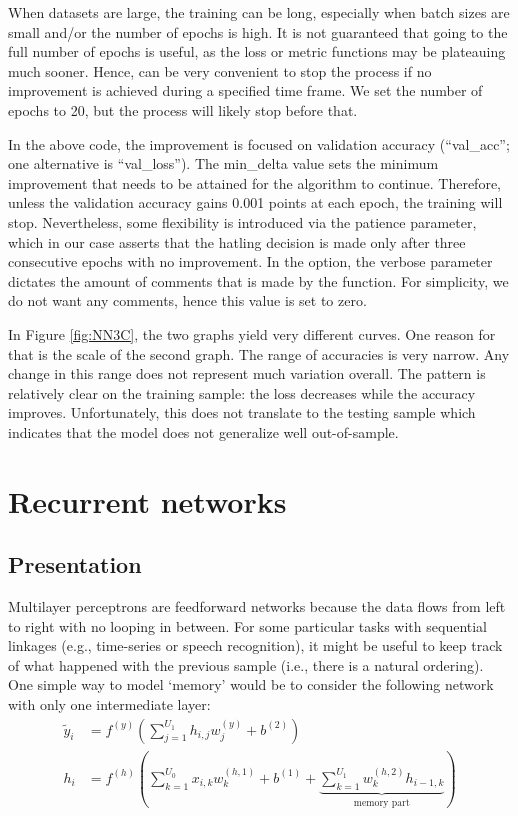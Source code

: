 \documentclass[]{krantz}
\theoremstyle{definition}
\theoremstyle{definition}
\theoremstyle{definition}
\theoremstyle{remark}
\begin{document}
When datasets are large, the training can be long, especially when batch
sizes are small and/or the number of epochs is high. It is not
guaranteed that going to the full number of epochs is useful, as the
loss or metric functions may be plateauing much sooner. Hence, can be
very convenient to stop the process if no improvement is achieved during
a specified time frame. We set the number of epochs to 20, but the
process will likely stop before that.

In the above code, the improvement is focused on validation accuracy
(``val\_acc''; one alternative is ``val\_loss''). The min\_delta value
sets the minimum improvement that needs to be attained for the algorithm
to continue. Therefore, unless the validation accuracy gains 0.001
points at each epoch, the training will stop. Nevertheless, some
flexibility is introduced via the patience parameter, which in our case
asserts that the hatling decision is made only after three consecutive
epochs with no improvement. In the option, the verbose parameter
dictates the amount of comments that is made by the function. For
simplicity, we do not want any comments, hence this value is set to
zero.

In Figure \ref{fig:NN3C}, the two graphs yield very different curves.
One reason for that is the scale of the second graph. The range of
accuracies is very narrow. Any change in this range does not represent
much variation overall. The pattern is relatively clear on the training
sample: the loss decreases while the accuracy improves. Unfortunately,
this does not translate to the testing sample which indicates that the
model does not generalize well out-of-sample.

\hypertarget{recurrent-networks}{%
\section{Recurrent networks}\label{recurrent-networks}}

\hypertarget{presentation}{%
\subsection{Presentation}\label{presentation}}

Multilayer perceptrons are feedforward networks because the data flows
from left to right with no looping in between. For some particular tasks
with sequential linkages (e.g., time-series or speech recognition), it
might be useful to keep track of what happened with the previous sample
(i.e., there is a natural ordering). One simple way to model `memory'
would be to consider the following network with only one intermediate
layer: \begin{align*}
\tilde{y}_i&=f^{(y)}\left(\sum_{j=1}^{U_1}h_{i,j}w^{(y)}_j+b^{(2)}\right) \\
h_{i} &=f^{(h)}\left(\sum_{k=1}^{U_0}x_{i,k}w^{(h,1)}_k+b^{(1)}+ \underbrace{\sum_{k=1}^{U_1}  w^{(h,2)}_{k}h_{i-1,k}}_{\text{memory part}} \right)
\end{align*}
\end{document}
